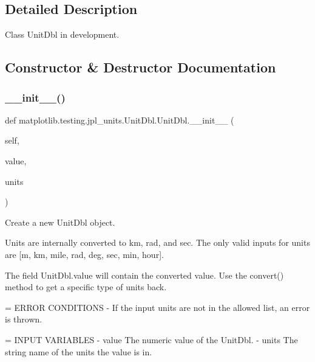 \subsection{Detailed Description}
\begin{DoxyVerb}Class UnitDbl in development.\end{DoxyVerb}
 

\subsection{Constructor \& Destructor Documentation}
\mbox{\label{classmatplotlib_1_1testing_1_1jpl__units_1_1UnitDbl_1_1UnitDbl_afafc3923bc9b131e3090d7cb6169e298}} 
\subsubsection{\texorpdfstring{\+\_\+\+\_\+init\+\_\+\+\_\+()}{\_\_init\_\_()}}
{\footnotesize\ttfamily def matplotlib.\+testing.\+jpl\+\_\+units.\+Unit\+Dbl.\+Unit\+Dbl.\+\_\+\+\_\+init\+\_\+\+\_\+ (\begin{DoxyParamCaption}\item[{}]{self,  }\item[{}]{value,  }\item[{}]{units }\end{DoxyParamCaption})}

\begin{DoxyVerb}Create a new UnitDbl object.

Units are internally converted to km, rad, and sec.  The only
valid inputs for units are [m, km, mile, rad, deg, sec, min, hour].

The field UnitDbl.value will contain the converted value.  Use
the convert() method to get a specific type of units back.

= ERROR CONDITIONS
- If the input units are not in the allowed list, an error is thrown.

= INPUT VARIABLES
- value     The numeric value of the UnitDbl.
- units     The string name of the units the value is in.
\end{DoxyVerb}
 


